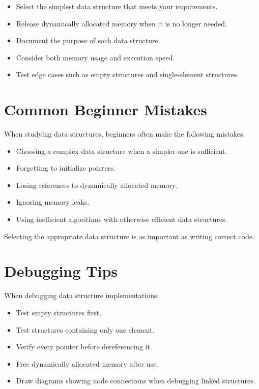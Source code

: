 \documentclass[12pt,openany]{book}
\begin{document}
\begin{itemize}
    \item Select the simplest data structure that meets your requirements.
    \item Release dynamically allocated memory when it is no longer needed.
    \item Document the purpose of each data structure.
    \item Consider both memory usage and execution speed.
    \item Test edge cases such as empty structures and single-element structures.
\end{itemize}
\section{Common Beginner Mistakes}

When studying data structures, beginners often make the following mistakes:

\begin{itemize}
    \item Choosing a complex data structure when a simpler one is sufficient.
    \item Forgetting to initialize pointers.
    \item Losing references to dynamically allocated memory.
    \item Ignoring memory leaks.
    \item Using inefficient algorithms with otherwise efficient data structures.
\end{itemize}

Selecting the appropriate data structure is as important as writing correct code.

\section{Debugging Tips}

When debugging data structure implementations:

\begin{itemize}
    \item Test empty structures first.
    \item Test structures containing only one element.
    \item Verify every pointer before dereferencing it.
    \item Free dynamically allocated memory after use.
    \item Draw diagrams showing node connections when debugging linked structures.
\end{itemize}
\end{document}
